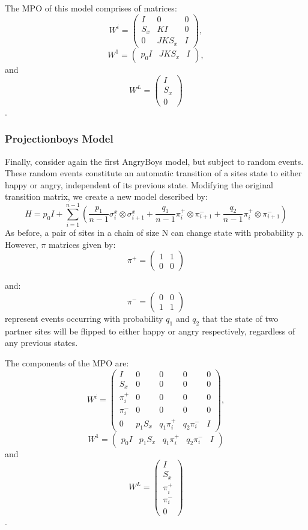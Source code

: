 \documentclass[english]{article}
\begin{document}
The MPO of this model comprises of matrices:
$$W^{i}=
\begin{pmatrix}
I & 0 & 0 \\
S_x & K I & 0 \\
0 & J K S_x & I
\end{pmatrix},
$$
$$W^1=\begin{pmatrix}p_0 I & J K S_x & I\end{pmatrix}, $$ 
and 
$$W^L=
\begin{pmatrix}
I \\ S_x \\0
\end{pmatrix}$$.


\subsubsection{Projectionboys Model}
Finally, consider again the first AngryBoys model, but subject to random events. These random events constitute an automatic transition of a sites state to either happy or angry, independent of its previous state. Modifying the original transition matrix, we create a new model described by:
\begin{displaymath}
H = p_0 I +  \sum_{i=1}^{n-1}(\frac{p_1}{n-1}\sigma_i^x\otimes\sigma_{i+1}^x + \frac{q_1}{n-1}\pi_i^+\otimes\pi_{i+1}^- + \frac{q_2}{n-1}\pi_i^+\otimes\pi_{i+1}^-)
\end{displaymath}
As before, a pair of sites in a chain of size N can change state with probability p. However, $\pi$ matrices given by:
$$\pi^{+}=
\begin{pmatrix}
1 & 1 \\
0 & 0
\end{pmatrix}$$
 
and:
$$\pi^{-}=
\begin{pmatrix}
0 & 0 \\
1 & 1
\end{pmatrix}$$
represent events occurring with probability $q_{1}$ and $q_{2}$ that the state of two partner sites will be flipped to either happy or angry respectively, regardless of any previous states.


The components of the MPO are:
$$W^{i}=
\begin{pmatrix}
I & 0 & 0 & 0 & 0 \\
S_x & 0 & 0  & 0 & 0 \\
\pi_i^+ & 0 & 0  & 0 & 0 \\
\pi_i^- & 0 & 0  & 0 & 0 \\
0 & p_1 S_x & q_1 \pi_i^+  & q_2 \pi_i^- & I
\end{pmatrix},$$
$$W^1=\begin{pmatrix}p_0 I & p_1 S_x & q_1 \pi_i^+ & q_2 \pi_i^- & I\end{pmatrix}$$ and
$$W^L=
\begin{pmatrix}
I \\ S_x \\ \pi_i^+ \\ \pi_i^- \\ 0
\end{pmatrix}$$.
\end{document}
